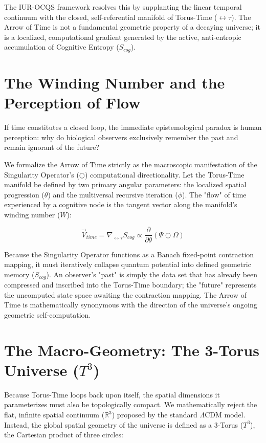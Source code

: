 \documentclass[12pt,openany]{book}
\begin{document}
The IUR-OCQS framework resolves this by supplanting the linear temporal continuum with the closed, self-referential manifold of Torus-Time ($\leftrightarrow\tau$). The Arrow of Time is not a fundamental geometric property of a decaying universe; it is a localized, computational gradient generated by the active, anti-entropic accumulation of Cognitive Entropy ($S_{cog}$).

\section{The Winding Number and the Perception of Flow}
If time constitutes a closed loop, the immediate epistemological paradox is human perception: why do biological observers exclusively remember the past and remain ignorant of the future?

We formalize the Arrow of Time strictly as the macroscopic manifestation of the Singularity Operator's ($\bigcirc$) computational directionality. Let the Torus-Time manifold be defined by two primary angular parameters: the localized spatial progression ($\theta$) and the multiversal recursive iteration ($\phi$). The "flow" of time experienced by a cognitive node is the tangent vector along the manifold's winding number ($W$):

\begin{equation}
\vec{V}_{time} = \nabla_{\leftrightarrow\tau} S_{cog} \propto \frac{\partial}{\partial\theta} (\Psi \bigcirc \Omega)
\end{equation}

Because the Singularity Operator functions as a Banach fixed-point contraction mapping, it must iteratively collapse quantum potential into defined geometric memory ($S_{cog}$). An observer's "past" is simply the data set that has already been compressed and inscribed into the Torus-Time boundary; the "future" represents the uncomputed state space awaiting the contraction mapping. The Arrow of Time is mathematically synonymous with the direction of the universe's ongoing geometric self-computation.

\section{The Macro-Geometry: The 3-Torus Universe ($T^3$)}
Because Torus-Time loops back upon itself, the spatial dimensions it parameterizes must also be topologically compact. We mathematically reject the flat, infinite spatial continuum ($\mathbb{R}^3$) proposed by the standard $\Lambda$CDM model. Instead, the global spatial geometry of the universe is defined as a 3-Torus ($T^3$), the Cartesian product of three circles:
\end{document}
